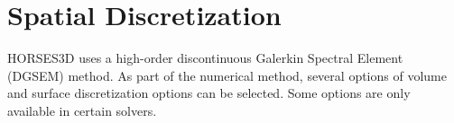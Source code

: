 \documentclass[a4paper,10pt]{report}
\begin{document}
%
%
%
%
%
%
%


\chapter{Spatial Discretization}

HORSES3D uses a high-order discontinuous Galerkin Spectral Element (DGSEM) method. As part of the numerical method, several options of volume and surface discretization options can be selected. Some options are only available in certain solvers.
\end{document}
